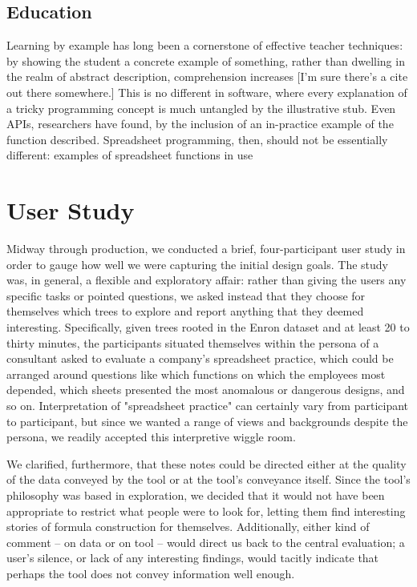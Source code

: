 \documentclass[conference]{IEEEtran}
\begin{document}
	\subsection{Education} Learning by example has long been a cornerstone of
	effective teacher techniques: by showing the student a concrete example of
	something, rather than dwelling in the realm of abstract description,
	comprehension increases [I'm sure there's a cite out there somewhere.] This is
	no different in software, where every explanation of a tricky programming
	concept is much untangled by the illustrative stub. Even APIs, researchers have
	found, by the inclusion of an in-practice example of the function described.
	Spreadsheet programming, then, should not be essentially different: examples of
	spreadsheet functions in use
	
	\section{User Study} Midway through production, we conducted a brief,
	four-participant user study in order to gauge how well we were capturing the
	initial design goals. The study was, in general, a flexible and exploratory
	affair: rather than giving the users any specific tasks or pointed questions,
	we asked instead that they choose for themselves which trees to explore and
	report anything that they deemed interesting. Specifically, given trees rooted
	in the Enron dataset and at least 20 to thirty minutes, the participants
	situated themselves within the persona of a consultant asked to evaluate a
	company's spreadsheet practice, which could be arranged around questions like
	which functions on which the employees most depended, which sheets presented
	the most anomalous or dangerous designs, and so on. Interpretation of
	"spreadsheet practice" can certainly vary from participant to participant, but
	since we wanted a range of views and backgrounds despite the persona, we
	readily accepted this interpretive wiggle room. \par
	
	We clarified, furthermore, that these notes could be directed either at the
	quality of the data conveyed by the tool or at the tool's conveyance itself.
	Since the tool's philosophy was based in exploration, we decided that it would
	not have been appropriate to restrict what people were to look for, letting
	them find interesting stories of formula construction for themselves.
	Additionally, either kind of comment -- on data or on tool -- would direct us
	back to the central evaluation; a user's silence, or lack of any interesting
	findings, would tacitly indicate that perhaps the tool does not convey
	information well enough. \par
	
\end{document}
